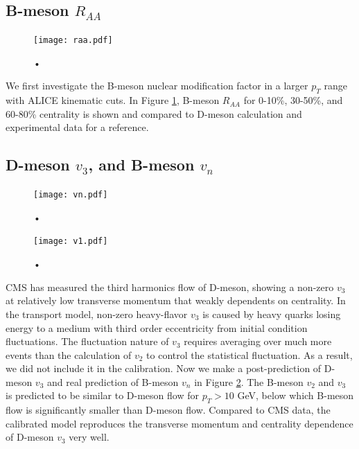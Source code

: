 \documentclass[aps, prc, reprint, amsmath, groupedaddress, nofootinbib]{revtex4-1}
\begin{document}
\subsection{B-meson $R_{AA}$}
\begin{figure}
\texttt{[image: raa.pdf]}
\caption{•}\label{plots:pred:raa}
\end{figure}
We first investigate the B-meson nuclear modification factor in a larger $p_T$ range with ALICE kinematic cuts.
In Figure \ref{plots:pred:raa}, B-meson $R_{AA}$ for 0-10\%, 30-50\%, and 60-80\% centrality is shown and compared to D-meson calculation and experimental data for a reference.
\subsection{D-meson $v_3$, and B-meson $v_n$}
\begin{figure}
\texttt{[image: vn.pdf]}
\caption{•}\label{plots:pred:vn}
\end{figure}
\begin{figure}
\texttt{[image: v1.pdf]}
\caption{•}\label{plots:pred:v1}
\end{figure}
CMS has measured the third harmonics flow of D-meson, showing a non-zero $v_3$ at relatively low transverse momentum that weakly dependents on centrality.
In the transport model, non-zero heavy-flavor $v_3$ is caused by heavy quarks losing energy to a medium with third order eccentricity from initial condition fluctuations.
The fluctuation nature of $v_3$ requires averaging over much more events than the calculation of $v_2$ to control the statistical fluctuation.
As a result, we did not include it in the calibration.
Now we make a post-prediction of D-meson $v_3$ and real prediction of B-meson $v_n$ in Figure \ref{plots:pred:vn}.
The B-meson $v_2$ and $v_3$ is predicted to be similar to D-meson flow for $p_T > 10$ GeV, below which B-meson flow is significantly smaller than D-meson flow.
Compared to CMS data, the calibrated model reproduces the transverse momentum and centrality dependence of D-meson $v_3$ very well.
\end{document}

